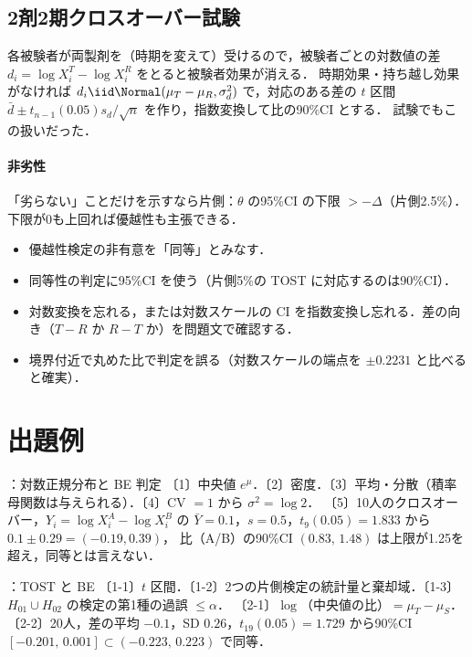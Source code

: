 \subsection{2剤2期クロスオーバー試験}
各被験者が両製剤を（時期を変えて）受けるので，被験者ごとの対数値の差 $d_i=\log X_i^T-\log X_i^R$ をとると被験者効果が消える．
時期効果・持ち越し効果がなければ $d_i\iid\Normal(\mu_T-\mu_R,\sigma_d^2)$ で，対応のある差の $t$ 区間 $\bar d\pm t_{n-1}(0.05)s_d/\sqrt n$ を作り，指数変換して比の90\%CI とする．
試験でもこの扱いだった．
\paragraph{非劣性}
「劣らない」ことだけを示すなら片側：$\theta$ の95\%CI の下限 $>-\Delta$（片側2.5\%）．下限が0も上回れば優越性も主張できる．

\begin{warnbox}
\begin{itemize}
\item 優越性検定の非有意を「同等」とみなす．
\item 同等性の判定に95\%CI を使う（片側5\%の TOST に対応するのは90\%CI）．
\item 対数変換を忘れる，または対数スケールの CI を指数変換し忘れる．差の向き（$T-R$ か $R-T$ か）を問題文で確認する．
\item 境界付近で丸めた比で判定を誤る（対数スケールの端点を $\pm0.2231$ と比べると確実）．
\end{itemize}
\end{warnbox}

\section{出題例}\label{sec:m10-shutsudai}
\begin{shutsudai}{：対数正規分布と BE 判定}
〔1〕中央値 $e^\mu$．〔2〕密度．〔3〕平均・分散（積率母関数は与えられる）．〔4〕CV $=1$ から $\sigma^2=\log2$．
〔5〕10人のクロスオーバー，$Y_i=\log X_i^A-\log X_i^B$ の $\bar Y=0.1$，$s=0.5$，$t_9(0.05)=1.833$ から $0.1\pm0.29=(-0.19,0.39)$，
比（A/B）の90\%CI $(0.83,\,1.48)$ は上限が1.25を超え，同等とは言えない．
\end{shutsudai}
\begin{shutsudai}{：TOST と BE}
〔1-1〕$t$ 区間．〔1-2〕2つの片側検定の統計量と棄却域．〔1-3〕$H_{01}\cup H_{02}$ の検定の第1種の過誤 $\le\alpha$．
〔2-1〕$\log$（中央値の比）$=\mu_T-\mu_S$．〔2-2〕20人，差の平均 $-0.1$，SD $0.26$，$t_{19}(0.05)=1.729$ から90\%CI $[-0.201,\,0.001]\subset(-0.223,\,0.223)$ で同等．
\end{shutsudai}

